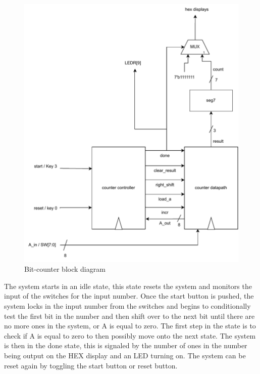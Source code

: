 \documentclass[11pt, titlepage]{article}
\begin{document}
            \begin{figure}[H]
                \centering
                \includegraphics[scale=0.7]{Images/task 1 block diagram.pdf}
                \caption{Bit-counter block diagram}
            \end{figure}
            
            The system starts in an idle state, this state resets the system and monitors the input of the switches for the input number. Once the start button is pushed, the system locks in the input number from the switches and begins to conditionally test the first bit in the number and then shift over to the next bit until there are no more ones in the system, or A is equal to zero. The first step in the state is to check if A is equal to zero to then possibly move onto the next state. The system is then in the done state, this is signaled by the number of ones in the number being output on the HEX display and an LED turning on. The system can be reset again by toggling the start button or reset button.
        
\end{document}
